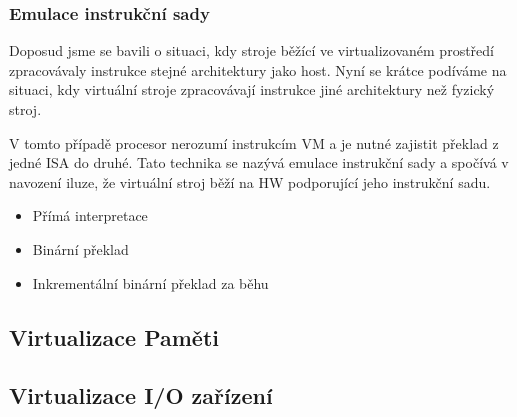 \subsubsection{Emulace instrukční sady}
\label{isa_emulation}

Doposud jsme se bavili o situaci, kdy stroje běžící ve virtualizovaném prostředí zpracovávaly instrukce stejné architektury jako host. Nyní se krátce podíváme na situaci, kdy virtuální stroje zpracovávají instrukce
jiné architektury než fyzický stroj.

V tomto případě procesor nerozumí instrukcím VM a je nutné zajistit překlad z jedné ISA do druhé. Tato technika se nazývá emulace instrukční sady a spočívá v navození iluze, že virtuální stroj běží
na HW podporující jeho instrukční sadu. 



\begin{itemize}
 \item Přímá interpretace
 \item Binární překlad
 \item Inkrementální binární překlad za běhu
\end{itemize}


\cite{virt3}



\subsection{Virtualizace Paměti}
\subsection{Virtualizace I/O zařízení}



